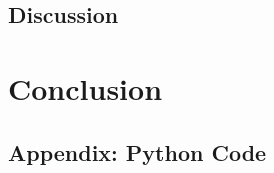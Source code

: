 \documentclass[a4paper,10pt]{article}
\begin{document}
\subsection{Discussion}
\section{Conclusion}





\printbibliography

\appendix
\subsection{Appendix: Python Code}
\inputminted{python}{simulation/SIRSimulation.py}
\inputminted{python}{simulation/application.py}
\end{document}

